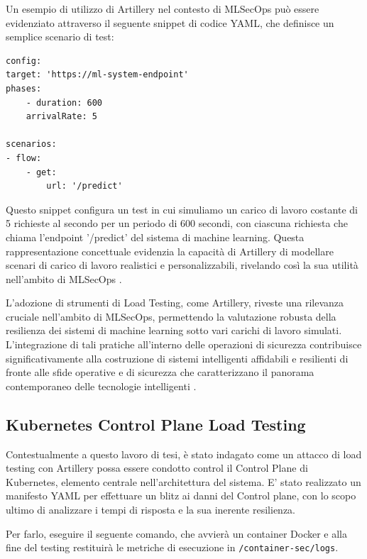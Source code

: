 Un esempio di utilizzo di Artillery nel contesto di MLSecOps può essere evidenziato attraverso il seguente snippet di codice YAML, che definisce un semplice scenario di test:

\begin{code}
\label{code:apx:a:yaml}
\begin{verbatim}
config:
target: 'https://ml-system-endpoint'
phases:
    - duration: 600
    arrivalRate: 5

scenarios:
- flow:
    - get:
        url: '/predict'

\end{verbatim}
\end{code}

Questo snippet configura un test in cui simuliamo un carico di lavoro costante di 5 richieste al secondo per un periodo di 600 secondi, con ciascuna richiesta che chiama l'endpoint '/predict' del sistema di machine learning. Questa rappresentazione concettuale evidenzia la capacità di Artillery di modellare scenari di carico di lavoro realistici e personalizzabili, rivelando così la sua utilità nell'ambito di MLSecOps \cite{artillery_configuration}.

L'adozione di strumenti di Load Testing, come Artillery, riveste una rilevanza cruciale nell'ambito di MLSecOps, permettendo la valutazione robusta della resilienza dei sistemi di machine learning sotto vari carichi di lavoro simulati. L'integrazione di tali pratiche all'interno delle operazioni di sicurezza contribuisce significativamente alla costruzione di sistemi intelligenti affidabili e resilienti di fronte alle sfide operative e di sicurezza che caratterizzano il panorama contemporaneo delle tecnologie intelligenti \cite{mlsecops_load_testing}.

\subsection{Kubernetes Control Plane Load Testing}

Contestualmente a questo lavoro di tesi, è stato indagato come un attacco di load testing con Artillery possa essere condotto control il Control Plane di Kubernetes, elemento centrale nell'architettura del sistema. E' stato realizzato un manifesto YAML per effettuare un blitz ai danni del Control plane, con lo scopo ultimo di analizzare i tempi di risposta e la sua inerente resilienza. 

Per farlo, eseguire il seguente comando, che avvierà un container Docker e alla fine del testing restituirà le metriche di esecuzione in {\small \verb|/container-sec/logs|}.

